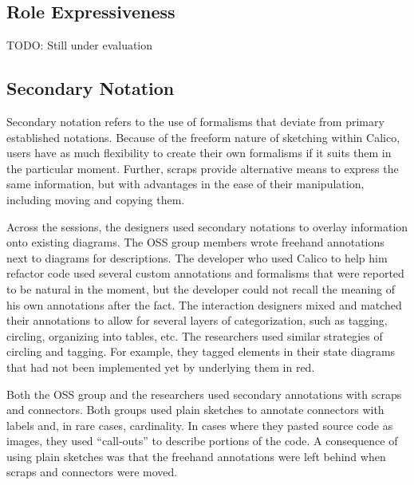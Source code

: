 
\subsection{Role Expressiveness}

TODO: Still under evaluation

\subsection{Secondary Notation}

Secondary notation refers to the use of formalisms that deviate from primary established notations. Because of the freeform nature of sketching within Calico, users have as much flexibility to create their own formalisms if it suits them in the particular moment. Further, scraps provide alternative means to express the same information, but with advantages in the ease of their manipulation, including moving and copying them.

Across the sessions, the designers used secondary notations to overlay information onto existing diagrams. The OSS group members wrote freehand annotations next to diagrams for descriptions. The developer who used Calico to help him refactor code used several custom annotations and formalisms that were reported to be natural in the moment, but the developer could not recall the meaning of his own annotations after the fact. The interaction designers mixed and matched their annotations to allow for several layers of categorization, such as tagging, circling, organizing into tables, etc. The researchers used similar strategies of circling and tagging. For example, they tagged elements in their state diagrams that had not been implemented yet by underlying them in red. 

Both the OSS group and the researchers used secondary annotations with scraps and connectors. Both groups used plain sketches to annotate connectors with labels and, in rare cases, cardinality. In cases where they pasted source code as images, they used ``call-outs'' to describe portions of the code. A consequence of using plain sketches was that the freehand annotations were left behind when scraps and connectors were moved.


